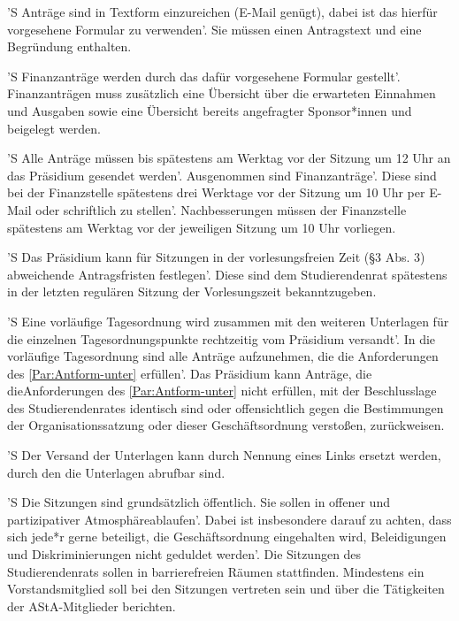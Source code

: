 \documentclass[fontsize=12pt,parskip=half, ref=short]{scrartcl}
\begin{document}
\begin{contract}
  \label{Par:Antform-unter}

  'S Anträge sind in Textform einzureichen (E-Mail genügt), dabei ist das
  hierfür vorgesehene Formular zu verwenden'. Sie müssen einen Antragstext und
  eine Begründung enthalten.

  'S Finanzanträge werden durch das dafür vorgesehene Formular gestellt'.
  Finanzanträgen muss zusätzlich eine Übersicht über die erwarteten Einnahmen
  und Ausgaben sowie eine Übersicht bereits angefragter Sponsor*innen und
  beigelegt werden.

  'S Alle Anträge müssen bis spätestens am Werktag vor der Sitzung um 12 Uhr an
  das Präsidium gesendet werden'. Ausgenommen sind Finanzanträge'. Diese sind
  bei der Finanzstelle spätestens drei Werktage vor der Sitzung um 10 Uhr per
  E-Mail oder schriftlich zu stellen'. Nachbesserungen müssen der Finanzstelle
  spätestens am Werktag vor der jeweiligen Sitzung um 10 Uhr vorliegen.

  'S Das Präsidium kann für Sitzungen in der vorlesungsfreien Zeit (§3 Abs. 3)
  abweichende Antragsfristen festlegen'. Diese sind dem Studierendenrat
  spätestens in der letzten regulären Sitzung der Vorlesungszeit bekanntzugeben.

  \label{Par:Vers-Sitzunter}
  'S Eine vorläufige Tagesordnung wird zusammen mit den weiteren Unterlagen für
  die einzelnen Tagesordnungspunkte rechtzeitig vom Präsidium versandt'. In die
  vorläufige Tagesordnung sind alle Anträge aufzunehmen, die die Anforderungen
  des \ref{Par:Antform-unter} erfüllen'. Das Präsidium kann Anträge, die
  dieAnforderungen des \ref{Par:Antform-unter} nicht erfüllen, mit der
  Beschlusslage des Studierendenrates identisch sind oder   offensichtlich
  gegen   die   Bestimmungen   der Organisationssatzung   oder   dieser
  Geschäftsordnung verstoßen, zurückweisen.
  
  'S Der Versand der Unterlagen kann durch Nennung eines Links ersetzt werden,
  durch den die Unterlagen abrufbar sind.

  \label{Par:Sitz}
  'S Die Sitzungen sind grundsätzlich öffentlich. Sie sollen in offener und
  partizipativer Atmosphäreablaufen'. Dabei ist insbesondere darauf zu achten,
  dass sich jede*r gerne beteiligt, die Geschäftsordnung eingehalten wird,
  Beleidigungen und Diskriminierungen nicht geduldet werden'. Die Sitzungen des
  Studierendenrats sollen in barrierefreien Räumen stattfinden. Mindestens ein
  Vorstandsmitglied soll bei den Sitzungen vertreten sein und über die
  Tätigkeiten der AStA-Mitglieder berichten.


\end{contract}
\end{document}
